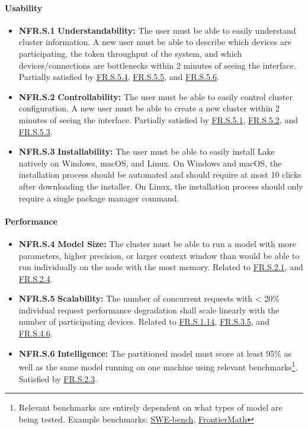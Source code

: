 \documentclass[12pt]{article}
\begin{document}
\paragraph{Usability}
\begin{itemize}
    \item \label{NFR.S.1}\textbf{NFR.S.1} \textbf{Understandability:} The user must be able to easily understand
		cluster information.
		A new user must be able to describe which devices are participating, the token throughput of the system,
		and which devices/connections are bottlenecks within 2 minutes of seeing the interface.
		Partially satisfied by \hyperref[FR.S.5.4]{FR.S.5.4}, \hyperref[FR.S.5.5]{FR.S.5.5}, and \hyperref[FR.S.5.6]{FR.S.5.6}.
	\item \label{NFR.S.2}\textbf{NFR.S.2} \textbf{Controllability:} The user must be able to easily control
		cluster configuration. A new user must be able to create a new cluster within 2 minutes of seeing the interface.
		Partially satisfied by \hyperref[FR.S.5.1]{FR.S.5.1}, \hyperref[FR.S.5.2]{FR.S.5.2},
		and \hyperref[FR.S.5.3]{FR.S.5.3}.
	\item \label{NFR.S.3}\textbf{NFR.S.3} \textbf{Installability:} The user must be able to easily install Lake
		natively on Windows, macOS, and Linux. On Windows and macOS, the installation process should be automated
		and should require at most 10 clicks after downloading the installer. On Linux, the installation process
		should only require a single package manager command.
\end{itemize}

\paragraph{Performance}
\begin{itemize}
	\item \label{NFR.S.4}\textbf{NFR.S.4} \textbf{Model Size:} The cluster must be able to run a model with more
		parameters, higher precision, or larger context window than would be able to run individually on the
		node with the most memory. Related to \hyperref[FR.S.2.1]{FR.S.2.1}, and
		\hyperref[FR.S.2.4]{FR.S.2.4}.
	\item \label{NFR.S.5}\textbf{NFR.S.5} \textbf{Scalability:} The number of concurrent requests with < 20\%
		individual request performance degradation shall scale linearly with the number of participating devices.
		Related to \hyperref[FR.S.1.14]{FR.S.1.14}, \hyperref[FR.S.3.5]{FR.S.3.5}, and \hyperref[FR.S.4.6]{FR.S.4.6}.
	\item \label{NFR.S.6}\textbf{NFR.S.6} \textbf{Intelligence:} The partitioned model must score at least 95\% as well
		as the same model running on one machine using relevant
		benchmarks\footnote{Relevant benchmarks are entirely dependent on what types of model are being tested.
		Example benchmarks: \href{https://github.com/swe-bench/SWE-bench}{SWE-bench},
		\href{https://epoch.ai/frontiermath}{FrontierMath}}. Satisfied by \hyperref[FR.S.2.3]{FR.S.2.3}.
\end{itemize}
\end{document}
